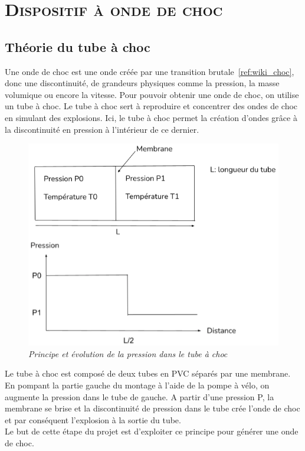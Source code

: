\renewcommand{\chaptername}{\scshape Partie}
\chapter{\normalfont \scshape Dispositif à onde de choc}
\section{Théorie du tube à choc}
Une onde de choc est une onde créée par une transition brutale~\ref{ref:wiki_choc}, donc une discontinuité, de grandeurs physiques comme la pression, la masse volumique ou encore la vitesse.
Pour pouvoir obtenir une onde de choc, on utilise un tube à choc. Le tube à choc sert à  reproduire et concentrer des ondes de choc en simulant des explosions.
Ici, le tube à choc permet la création d’ondes grâce à la discontinuité en pression à l’intérieur de ce dernier.\\
\begin{figure}[H]
	\centering
	\includegraphics[scale = 0.4]{figures/principe_choc.png}
	\caption{\small{\textit{Principe et évolution de la pression dans le tube à choc}}}
	\label{fig:principe_choc}
\end{figure}
Le tube à choc est composé de deux tubes en PVC séparés par une membrane. En pompant la partie gauche du montage à l'aide de la pompe à vélo, on augmente la pression dans le tube de gauche. A partir d'une pression P, la membrane se brise et la discontinuité de pression dans le tube crée l'onde de choc et par conséquent l'explosion à la sortie du tube.\\
Le but de cette étape du projet est d'exploiter ce principe pour générer une onde de choc.
